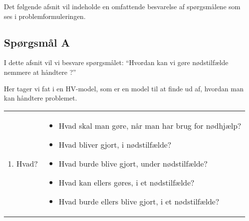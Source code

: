 Det følgende afsnit vil indeholde en omfattende besvarelse af spørgsmålene som ses i problemformuleringen.

\subsection{Spørgsmål A}
I dette afsnit vil vi besvare spørgsmålet: ``Hvordan kan vi gøre nødstilfælde nemmere at håndtere ?''

Her tager vi fat i en HV-model, som er en model til at finde ud af, hvordan man kan håndtere problemet.

\begin{table}[H]
    \centering
    \begin{tabular}{|p{4cm}|p{10cm}|}
        \hline
        1. Hvad? &
        \begin{itemize}
            \item Hvad skal man gøre, når man har brug for nødhjælp?
            \item Hvad bliver gjort, i nødstilfælde?
            \item Hvad burde blive gjort, under nødstilfælde?
            \item Hvad kan ellers gøres, i et nødstilfælde?
            \item Hvad burde ellers blive gjort, i et nødstilfælde?


\end{itemize}
\end{tabular}
\end{table}
